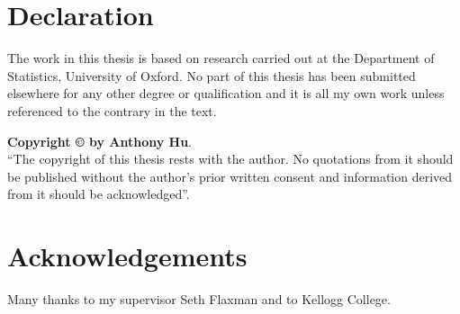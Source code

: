 

\chapter*{Declaration}
The work in this thesis is based on research carried out at the Department of Statistics, University of Oxford. No part of this thesis has been submitted elsewhere for any other degree or qualification and it is all my own work unless referenced to the contrary in the text.


\vfill
\noindent \textbf{Copyright \copyright{} by Anthony Hu}.\\
``The copyright of this thesis rests with the author.  No quotations
from it should be published without the author's prior written consent
and information derived from it should be acknowledged''.



\chapter*{Acknowledgements}
Many thanks to my supervisor Seth Flaxman and to Kellogg College.

